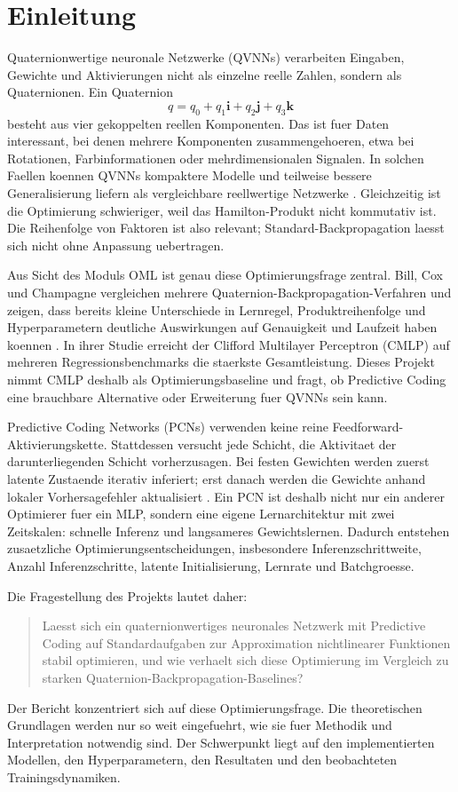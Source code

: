 \section{Einleitung}

Quaternionwertige neuronale Netzwerke (QVNNs) verarbeiten Eingaben, Gewichte und Aktivierungen nicht als einzelne reelle Zahlen, sondern als Quaternionen. Ein Quaternion
\[
q = q_0 + q_1\mathbf{i} + q_2\mathbf{j} + q_3\mathbf{k}
\]
besteht aus vier gekoppelten reellen Komponenten. Das ist fuer Daten interessant, bei denen mehrere Komponenten zusammengehoeren, etwa bei Rotationen, Farbinformationen oder mehrdimensionalen Signalen. In solchen Faellen koennen QVNNs kompaktere Modelle und teilweise bessere Generalisierung liefern als vergleichbare reellwertige Netzwerke \cite{bill2023comparison,article}. Gleichzeitig ist die Optimierung schwieriger, weil das Hamilton-Produkt nicht kommutativ ist. Die Reihenfolge von Faktoren ist also relevant; Standard-Backpropagation laesst sich nicht ohne Anpassung uebertragen.

Aus Sicht des Moduls OML ist genau diese Optimierungsfrage zentral. Bill, Cox und Champagne vergleichen mehrere Quaternion-Backpropagation-Verfahren und zeigen, dass bereits kleine Unterschiede in Lernregel, Produktreihenfolge und Hyperparametern deutliche Auswirkungen auf Genauigkeit und Laufzeit haben koennen \cite{bill2023comparison}. In ihrer Studie erreicht der Clifford Multilayer Perceptron (CMLP) auf mehreren Regressionsbenchmarks die staerkste Gesamtleistung. Dieses Projekt nimmt CMLP deshalb als Optimierungsbaseline und fragt, ob Predictive Coding eine brauchbare Alternative oder Erweiterung fuer QVNNs sein kann.

Predictive Coding Networks (PCNs) verwenden keine reine Feedforward-Aktivierungskette. Stattdessen versucht jede Schicht, die Aktivitaet der darunterliegenden Schicht vorherzusagen. Bei festen Gewichten werden zuerst latente Zustaende iterativ inferiert; erst danach werden die Gewichte anhand lokaler Vorhersagefehler aktualisiert \cite{stenlund2025pcn}. Ein PCN ist deshalb nicht nur ein anderer Optimierer fuer ein MLP, sondern eine eigene Lernarchitektur mit zwei Zeitskalen: schnelle Inferenz und langsameres Gewichtslernen. Dadurch entstehen zusaetzliche Optimierungsentscheidungen, insbesondere Inferenzschrittweite, Anzahl Inferenzschritte, latente Initialisierung, Lernrate und Batchgroesse.

Die Fragestellung des Projekts lautet daher:

\begin{quote}
Laesst sich ein quaternionwertiges neuronales Netzwerk mit Predictive Coding auf Standardaufgaben zur Approximation nichtlinearer Funktionen stabil optimieren, und wie verhaelt sich diese Optimierung im Vergleich zu starken Quaternion-Backpropagation-Baselines?
\end{quote}

Der Bericht konzentriert sich auf diese Optimierungsfrage. Die theoretischen Grundlagen werden nur so weit eingefuehrt, wie sie fuer Methodik und Interpretation notwendig sind. Der Schwerpunkt liegt auf den implementierten Modellen, den Hyperparametern, den Resultaten und den beobachteten Trainingsdynamiken.
